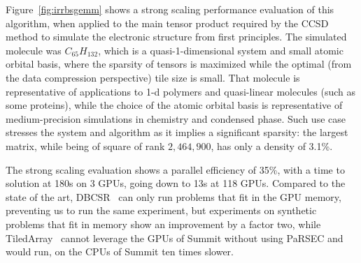 Figure~\ref{fig:irrbsgemm} shows a strong scaling performance
evaluation of this algorithm, when applied to the main tensor product
required by the CCSD method to simulate the electronic structure from
first principles. The simulated molecule was $C_{65}H_{132}$, which is
a quasi-1-dimensional system and small atomic orbital basis, where the
sparsity of tensors is maximized while the optimal (from the data
compression perspective) tile size is small. That molecule is
representative of applications to 1-d polymers and quasi-linear
molecules (such as some proteins), while the choice of the atomic
orbital basis is representative of medium-precision simulations in
chemistry and condensed phase. Such use case stresses the system and
algorithm as it implies a significant sparsity: the largest matrix,
while being of square of rank $2,464,900$, has only a density of
3.1\%.

The strong scaling evaluation shows a parallel efficiency of 35\%,
with a time to solution at 180s on 3 GPUs, going down to 13s at 118
GPUs.
Compared to the state of the art, DBCSR~\cite{parsec::dbcsr} can only
run problems that fit in the GPU memory, preventing us to run the same
experiment, but experiments on synthetic problems that fit in memory
show an improvement by a factor two, while
TiledArray~\cite{parsec::tiledarray} cannot leverage the GPUs of
Summit without using PaRSEC and would run, on the CPUs of Summit ten
times slower.
%
%

